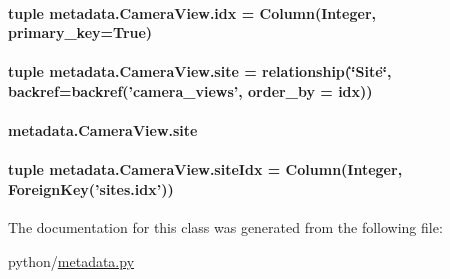 \hypertarget{classmetadata_1_1CameraView_a735226fd4eb9bb825e05d377758f0814}{
\paragraph[{idx}]{\setlength{\rightskip}{0pt plus 5cm}tuple metadata.\-Camera\-View.\-idx = Column(Integer, primary\-\_\-key=True)\hspace{0.3cm}{\ttfamily [static]}}}\label{classmetadata_1_1CameraView_a735226fd4eb9bb825e05d377758f0814}
\hypertarget{classmetadata_1_1CameraView_acb7a348380b63ceff7a34df0a605e9d7}{
\paragraph[{site}]{\setlength{\rightskip}{0pt plus 5cm}tuple metadata.\-Camera\-View.\-site = relationship(\char`\"{}Site\char`\"{}, backref=backref('camera\-\_\-views', order\-\_\-by = {\bf idx}))\hspace{0.3cm}{\ttfamily [static]}}}\label{classmetadata_1_1CameraView_acb7a348380b63ceff7a34df0a605e9d7}
\hypertarget{classmetadata_1_1CameraView_ade3d4831d427a621900ced9ffef79a08}{
\paragraph[{site}]{\setlength{\rightskip}{0pt plus 5cm}metadata.\-Camera\-View.\-site}}\label{classmetadata_1_1CameraView_ade3d4831d427a621900ced9ffef79a08}
\hypertarget{classmetadata_1_1CameraView_a0f596684a5898f249135bb6b280e74e5}{
\paragraph[{site\-Idx}]{\setlength{\rightskip}{0pt plus 5cm}tuple metadata.\-Camera\-View.\-site\-Idx = Column(Integer, Foreign\-Key('sites.\-idx'))\hspace{0.3cm}{\ttfamily [static]}}}\label{classmetadata_1_1CameraView_a0f596684a5898f249135bb6b280e74e5}


The documentation for this class was generated from the following file\-:\begin{DoxyCompactItemize}
\item 
python/\hyperlink{metadata_8py}{metadata.\-py}\end{DoxyCompactItemize}
